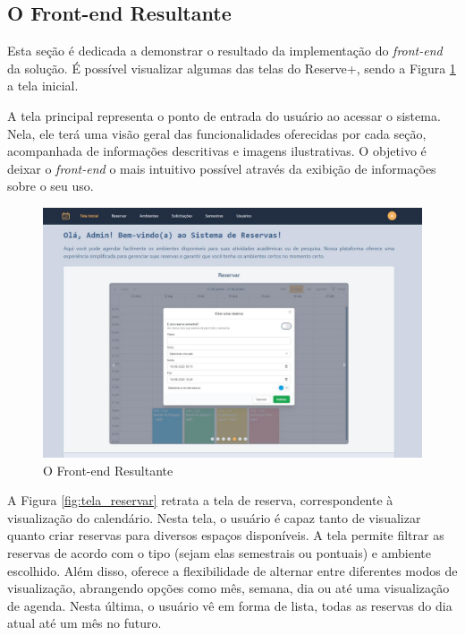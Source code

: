 \documentclass[12pt]{article}
\begin{document}
\subsection{O Front-end Resultante} \label{sec:front_end_resultante}

Esta seção é dedicada a demonstrar o resultado da implementação do \textit{front-end} da solução. É possível visualizar algumas das telas do Reserve+, sendo a Figura \ref{fig:front_end_resultante} a tela inicial. 

A tela principal representa o ponto de entrada do usuário ao acessar o sistema. Nela, ele terá uma visão geral das funcionalidades oferecidas por cada seção, acompanhada de informações descritivas e imagens ilustrativas. O objetivo é deixar o \textit{front-end} o mais intuitivo possível através da exibição de informações sobre o seu uso.

\begin{figure}[ht]
\centering
\includegraphics[width=1.0\textwidth]{front_end_resultante.jpg}
\caption{O Front-end Resultante}
\label{fig:front_end_resultante}
\end{figure}

A Figura \ref{fig:tela_reservar} retrata a tela de reserva, correspondente à visualização do calendário. Nesta tela, o usuário é capaz tanto de visualizar quanto criar reservas para diversos espaços disponíveis. A tela permite filtrar as reservas de acordo com o tipo (sejam elas semestrais ou pontuais) e ambiente escolhido. Além disso, oferece a flexibilidade de alternar entre diferentes modos de visualização, abrangendo opções como mês, semana, dia ou até uma visualização de agenda. Nesta última, o usuário vê em forma de lista, todas as reservas do dia atual até um  mês no futuro.
\end{document}
